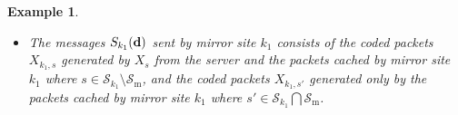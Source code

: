 \documentclass[onecolumn,10pt]{IEEEtran}
\theoremstyle{mythm}
\newtheorem{example}{Example}
\begin{document}
\begin{example}
\begin{itemize}
\begin{itemize}
\begin{equation*}
\begin{split}
        &W_{1,11}\oplus W_{2,7}\oplus W_{3,4}\oplus W_{4,2}\oplus W_{5,1}, \\
        &W_{1,12}\oplus W_{2,8}\oplus W_{3,5}\oplus W_{4,3}\oplus W_{6,1}, \\
        &W_{1,13}\oplus W_{2,9}\oplus W_{3,6}\oplus W_{5,3}\oplus W_{6,2}, \\
        &W_{1,14}\oplus W_{2,10}\oplus W_{4,6}\oplus W_{5,5}\oplus W_{6,4}, \\
        &W_{1,15}\oplus W_{3,10}\oplus W_{4,9}\oplus W_{5,8}\oplus W_{6,7}, \\
        &W_{2,15}\oplus W_{3,14}\oplus W_{4,13}\oplus W_{5,12}\oplus W_{6,11},
	\end{split}
\end{equation*}	to all mirror sites. So the transmission load of the first layer is $R_1=\frac{6}{15}=0.4$.
\item The messages $S_{k_1}({\bf d})$ sent by mirror site $k_1$ consists of the coded packets $X_{k_1,s}$ generated by $X_s$ from the server and the packets cached by mirror site $k_1$ where $s\in\mathcal{S}_{k_1}\setminus\mathcal{S}_\text{m}$, and the coded packets $X_{k_1,s'}$ generated only by the packets cached by mirror site $k_1$ where $s'\in \mathcal{S}_{k_1}\bigcap \mathcal{S}_{\text{m}}$.


\end{itemize}
\end{itemize}
\end{example}
\end{document}
